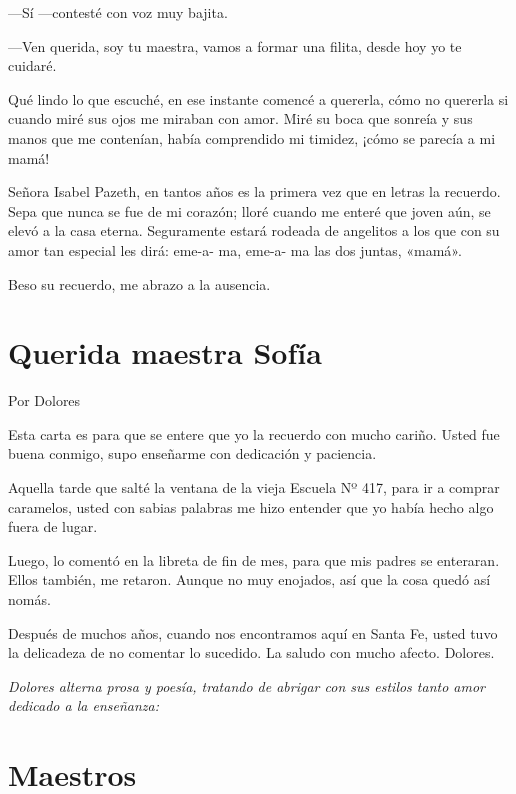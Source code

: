 \documentclass[11pt,twoside,openright,a5paper]{book}
\begin{document}
---Sí ---contesté con voz muy bajita.

---Ven querida, soy tu maestra, vamos a formar una filita, desde hoy yo te cuidaré. 

Qué lindo lo que escuché, en ese instante comencé a quererla, cómo no quererla si cuando miré sus ojos me miraban con amor. Miré su boca que sonreía y sus manos que me contenían, había comprendido mi timidez, ¡cómo se parecía a mi mamá!

Señora Isabel Pazeth, en tantos años es la primera vez que en letras la recuerdo. Sepa que nunca se fue de mi corazón; lloré cuando me enteré que joven aún, se elevó a la casa eterna. Seguramente estará rodeada de angelitos a los que con su amor tan especial les dirá: eme-a- ma, eme-a- ma las dos juntas, «mamá».

Beso su recuerdo, me abrazo a la ausencia.

\section*{Querida maestra Sofía}

                                                                                 \begin{flushright}Por Dolores\end{flushright}

Esta carta es para que se entere que yo la recuerdo con mucho cariño. Usted fue buena conmigo, supo enseñarme con dedicación y paciencia.

Aquella tarde que salté la ventana de la vieja Escuela Nº 417, para ir a comprar caramelos, usted con sabias palabras me hizo entender que yo había hecho algo fuera de lugar.

Luego,  lo comentó en la libreta de fin de mes, para que mis padres se enteraran. Ellos también, me retaron. Aunque no muy enojados, así que la cosa quedó así nomás.

Después de muchos años, cuando nos encontramos aquí en Santa Fe, usted tuvo la delicadeza de no comentar lo sucedido. La saludo con mucho afecto. Dolores.

\vspace{0.5cm}
\emph{Dolores alterna prosa y poesía, tratando de abrigar con sus estilos tanto amor dedicado a la enseñanza:}


\section*{Maestros}
\end{document}
